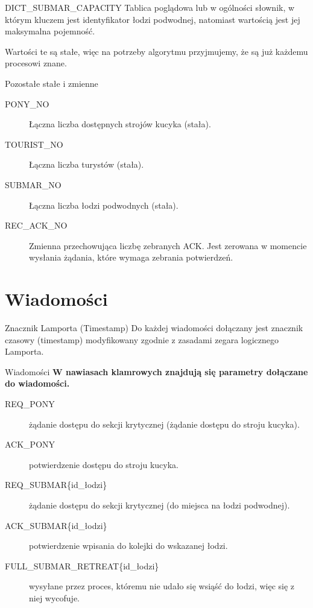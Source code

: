 \documentclass{beamer}
\begin{document}
\begin{frame}{DICT\_SUBMAR\_CAPACITY}
    \internallinenumbers
    \resetlinenumber[1]
    Tablica poglądowa lub w ogólności słownik, w którym kluczem jest identyfikator łodzi podwodnej, natomiast wartością jest jej maksymalna pojemność.

    \vspace{0.4cm}
    Wartości te są stałe, więc na potrzeby algorytmu przyjmujemy, że są już każdemu procesowi znane.
\end{frame}


\begin{frame}{Pozostałe stałe i zmienne}
    \begin{description}
        \item [PONY\_NO] Łączna liczba dostępnych strojów kucyka (stała).
        \item [TOURIST\_NO] Łączna liczba turystów (stała).
        \item [SUBMAR\_NO] Łączna liczba łodzi podwodnych (stała).
        \item [REC\_ACK\_NO] Zmienna przechowująca liczbę zebranych ACK. Jest zerowana w momencie wysłania żądania, które wymaga zebrania potwierdzeń.
    \end{description}

\end{frame}

\section{Wiadomości}
\begin{frame}{Znacznik Lamporta (Timestamp)}
    \internallinenumbers
    \resetlinenumber[1]
    Do każdej wiadomości dołączany jest znacznik czasowy (timestamp) modyfikowany zgodnie z zasadami zegara logicznego Lamporta.
\end{frame}

\begin{frame}{Wiadomości}
    \internallinenumbers
    \resetlinenumber[1]
    \textbf{W nawiasach klamrowych znajdują się parametry dołączane do wiadomości. }
    \begin{description}
        \item [REQ\_PONY] żądanie dostępu do sekcji krytycznej (żądanie dostępu do stroju kucyka).
        \item [ACK\_PONY] potwierdzenie dostępu do stroju kucyka.
        \item [REQ\_SUBMAR\{id\_łodzi\}] żądanie dostępu do sekcji krytycznej (do miejsca na łodzi podwodnej).
        \item [ACK\_SUBMAR\{id\_łodzi\}] potwierdzenie wpisania do kolejki do wskazanej łodzi.
        \item [FULL\_SUBMAR\_RETREAT\{id\_łodzi\}] wysyłane przez proces, któremu nie udało się wsiąść do łodzi, więc się z niej wycofuje.
    \end{description}
\end{frame}
\end{document}
